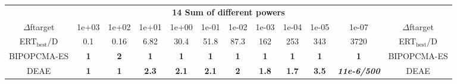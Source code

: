 \begin{tabular}{cccccccccccc}
 & \multicolumn{10}{c}{{\normalsize \textbf{14 Sum of different powers}}}\\
$\Delta$ftarget& 1e+03& 1e+02& 1e+01& 1e+00& 1e-01& 1e-02& 1e-03& 1e-04& 1e-05& 1e-07 & $\Delta$ftarget \\
ERT$_{\textrm{best}}$/D& 0.1& 0.16& 6.82& 30.4& 51.8& 87.3& 162& 253& 343& 3720 & ERT$_{\textrm{best}}$/D \\
\hline
BIPOPCMA-ES & \textbf{1} & \textbf{2} & \textbf{1} & \textbf{1} & \textbf{1} & \textbf{1} & \textbf{1} & \textbf{1} & \textbf{1} & \textbf{1} & BIPOPCMA-ES \cite{add_an_entry_for_BIPOPCMA-ES_in_bbob.bib}\\
DEAE & \textbf{1} & \textbf{1} & \textbf{2.3} & \textbf{2.1} & \textbf{2.1} & \textbf{2} & \textbf{1.8} & \textbf{1.7} & \textbf{3.5} & \textbf{\textit{11e-6}\textit{/500}} & DEAE \cite{add_an_entry_for_DEAE_in_bbob.bib}
\end{tabular}
